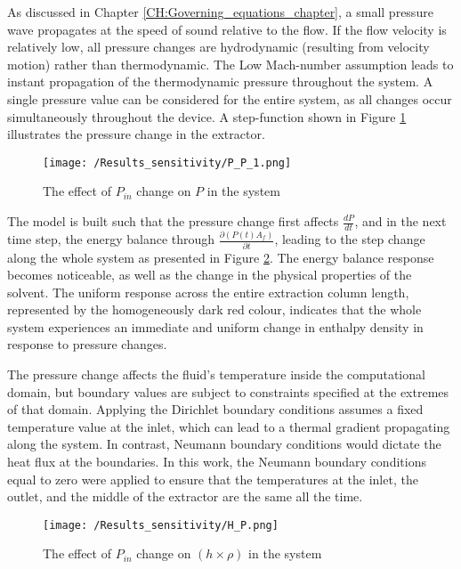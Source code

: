 \documentclass[../Article_Sensitivity_Analsysis.tex]{subfiles}
\begin{document}
	
	
	As discussed in Chapter \ref{CH:Governing_equations_chapter}, a small pressure wave propagates at the speed of sound relative to the flow. If the flow velocity is relatively low, all pressure changes are hydrodynamic (resulting from velocity motion) rather than thermodynamic. The Low Mach-number assumption leads to instant propagation of the thermodynamic pressure throughout the system. A single pressure value can be considered for the entire system, as all changes occur simultaneously throughout the device. A step-function shown in Figure \ref{fig:Sensitivty_P_P} illustrates the pressure change in the extractor.
	
	\begin{figure}[h!]
		\centering
		\texttt{[image: /Results\_sensitivity/P\_P\_1.png]}
		\caption{The effect of $P_{in}$ change on $P$ in the system}
		\label{fig:Sensitivty_P_P}
	\end{figure}
	
	The model is built such that the pressure change first affects $\frac{dP}{dt}$, and in the next time step, the energy balance through $\frac{\partial (P(t) A_f)}{\partial t}$, leading to the step change along the whole system as presented in Figure \ref{fig:Sensitivty_P_H}. The energy balance response becomes noticeable, as well as the change in the physical properties of the solvent. The uniform response across the entire extraction column length, represented by the homogeneously dark red colour, indicates that the whole system experiences an immediate and uniform change in enthalpy density in response to pressure changes. 
	
	The pressure change affects the fluid's temperature inside the computational domain, but boundary values are subject to constraints specified at the extremes of that domain. Applying the Dirichlet boundary conditions assumes a fixed temperature value at the inlet, which can lead to a thermal gradient propagating along the system. In contrast, Neumann boundary conditions would dictate the heat flux at the boundaries. In this work, the Neumann boundary conditions equal to zero were applied to ensure that the temperatures at the inlet, the outlet, and the middle of the extractor are the same all the time.
	
	\begin{figure}[h!]
		\centering
		\texttt{[image: /Results\_sensitivity/H\_P.png]}
		\caption{The effect of $P_{in}$ change on $(h \times \rho)$ in the system}
		\label{fig:Sensitivty_P_H}
	\end{figure}
	
\end{document}

